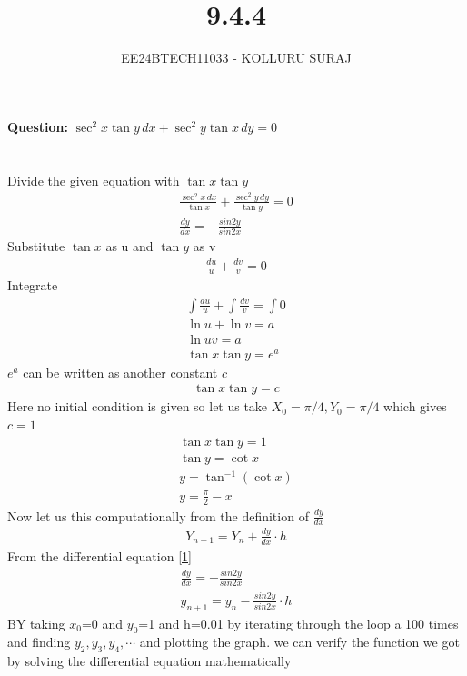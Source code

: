 \documentclass[journal]{IEEEtran}
\numberwithin{equation}{enumi}
\numberwithin{figure}{enumi}
\begin{document}

\title{9.4.4}
\author{EE24BTECH11033 - KOLLURU SURAJ}
{\let\newpage\relax\maketitle}
\textbf{Question:} 
$\sec^2 x \tan y \, dx + \sec^2 y \tan x \, dy = 0$
\\\\
\solution\\
Divide the given equation with $\tan x \tan y$
\begin{align}
    \frac{\sec^2 x \, dx}{\tan x} + \frac{\sec^2 y \, dy}{\tan y} = 0\\
    \frac{dy}{dx}=-\frac{sin2y}{sin2x}\label{1}
\end{align}
Substitute $\tan x$ as u and $\tan y$ as v
\begin{align}
    \frac{du}{u} + \frac{dv}{v} = 0
\end{align}
Integrate
\begin{align}
\int  \frac{du}{u} + \int \frac{dv}{v} = \int 0\\
    \ln u + \ln v = a\\
    \ln uv = a\\
    \tan x \tan y = e^a
\end{align}
 $e^a$ can be written as another constant $c$
 \begin{align}
      \tan x \tan y = c
 \end{align}
Here no initial condition is given so let us take $X_{0}=\pi/4,Y_{0}=\pi/4$ which gives $c=1$
\begin{align}
    \tan x \tan y = 1\\
    \tan y = \cot x\\
    y = \tan^{-1}(\cot x)\\
    y= \frac{\pi}{2}- x
\end{align}
Now let us  this computationally from the definition of $\frac{dy}{dx}$ 
\begin{align}
    Y_{n+1}=Y_n+\frac{dy}{dx}\cdot h
\end{align}
From the differential equation \ref{1}
\begin{align}
    \frac{dy}{dx}=-\frac{sin2y}{sin2x}\\
    y_{n+1}=y_n-\frac{sin2y}{sin2x}\cdot h
\end{align}
BY taking $x_0$=0 and $y_0$=1 and h=0.01  by iterating through the loop a 100 times and finding $y_2,y_3,y_4,\cdots$ and plotting the graph. we can verify the function we got by solving the differential equation mathematically
\end{document}
